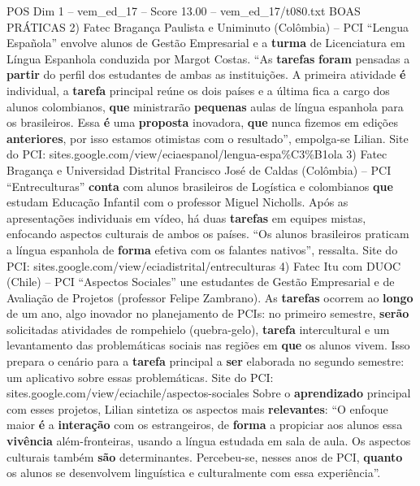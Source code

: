 \begin{textsample}{POS Dim 1 – vem\_ed\_17 – Score 13.00 – vem\_ed\_17/t080.txt}  \label{ex:f1_pos_132}
BOAS PRÁTICAS 2) Fatec Bragança Paulista e Uniminuto (Colômbia) – PCI “Lengua Española” envolve alunos de Gestão Empresarial e a \textbf{turma} de Licenciatura em Língua Espanhola conduzida por Margot Costas. “As \textbf{tarefas} \textbf{foram} pensadas a \textbf{partir} do perfil dos estudantes de ambas as instituições.
A primeira atividade \textbf{é} individual, a \textbf{tarefa} principal reúne os dois países e a última fica a cargo dos alunos colombianos, \textbf{que} ministrarão \textbf{pequenas} aulas de língua espanhola para os brasileiros.
Essa \textbf{é} uma \textbf{proposta} inovadora, \textbf{que} nunca fizemos em edições \textbf{anteriores}, por isso estamos otimistas com o resultado”, empolga-se Lilian.
Site do PCI: sites.google.com/view/eciaespanol/lengua-espa\%C3\%B1ola 3) Fatec Bragança e Universidad Distrital Francisco José de Caldas (Colômbia) – PCI “Entreculturas” \textbf{conta} com alunos brasileiros de Logística e colombianos \textbf{que} estudam Educação Infantil com o professor Miguel Nicholls.
Após as apresentações individuais em vídeo, há duas \textbf{tarefas} em equipes mistas, enfocando aspectos culturais de ambos os países. “Os alunos brasileiros praticam a língua espanhola de \textbf{forma} efetiva com os falantes nativos”, ressalta.
Site do PCI: sites.google.com/view/eciadistrital/entreculturas 4) Fatec Itu com DUOC (Chile) – PCI “Aspectos Sociales” une estudantes de Gestão Empresarial e de Avaliação de Projetos (professor Felipe Zambrano).
As \textbf{tarefas} ocorrem ao \textbf{longo} de um ano, algo inovador no planejamento de PCIs: no primeiro semestre, \textbf{serão} solicitadas atividades de rompehielo (quebra-gelo), \textbf{tarefa} intercultural e um levantamento das problemáticas sociais nas regiões em \textbf{que} os alunos vivem.
Isso prepara o cenário para a \textbf{tarefa} principal a \textbf{ser} elaborada no segundo semestre: um aplicativo sobre essas problemáticas.
Site do PCI: sites.google.com/view/eciachile/aspectos-sociales Sobre o \textbf{aprendizado} principal com esses projetos, Lilian sintetiza os aspectos mais \textbf{relevantes}: “O enfoque maior \textbf{é} a \textbf{interação} com os estrangeiros, de \textbf{forma} a propiciar aos alunos essa \textbf{vivência} além-fronteiras, usando a língua estudada em sala de aula.
Os aspectos culturais também \textbf{são} determinantes.
Percebeu-se, nesses anos de PCI, \textbf{quanto} os alunos se desenvolvem linguística e culturalmente com essa experiência”.

\end{textsample}
